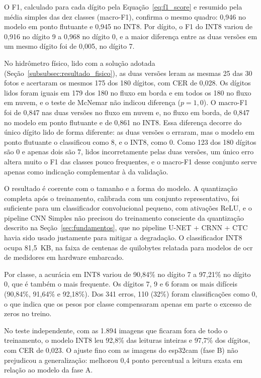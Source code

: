 O F1, calculado para cada dígito pela Equação~\eqref{eq:f1_score} e resumido pela média
simples das dez classes (macro-F1), confirma o mesmo quadro: 0,946 no modelo em ponto
flutuante e 0,945 no INT8. Por dígito, o F1 do INT8 variou de 0,916 no dígito 9 a 0,968 no
dígito 0, e a maior diferença entre as duas versões em um mesmo dígito foi de 0,005, no
dígito 7.

No hidrômetro físico, lido com a solução adotada (Seção~\ref{subsubsec:resultado_fisico}),
as duas versões leram as mesmas 25 das 30 fotos e acertaram os mesmos 175 dos 180 dígitos,
com CER de 0,028. Os dígitos lidos foram iguais em 179 dos 180 no fluxo em borda e em
todos os 180 no fluxo em nuvem, e o teste de McNemar não indicou diferença ($p = 1{,}0$).
O macro-F1 foi de 0,847 nas duas versões no fluxo em nuvem e, no fluxo em borda, de 0,847
no modelo em ponto flutuante e de 0,861 no INT8. Essa diferença decorre do único dígito
lido de forma diferente: as duas versões o erraram, mas o modelo em ponto flutuante o
classificou como 8, e o INT8, como 0. Como 123 dos 180 dígitos são 0 e apenas dois são 7,
lidos incorretamente pelas duas versões, um único erro altera muito o F1 das classes pouco
frequentes, e o macro-F1 desse conjunto serve apenas como indicação complementar à da
validação.

O resultado é coerente com o tamanho e a forma do modelo. A quantização completa após o
treinamento, calibrada com um conjunto representativo, foi suficiente para um classificador
convolucional pequeno, com ativações ReLU, e o pipeline CNN Simples não precisou do treinamento
consciente da quantização descrito na Seção~\ref{sec:fundamentos}, que no pipeline U-NET + CRNN + CTC havia
sido usado justamente para mitigar a degradação. O
classificador INT8 ocupa 81,5~KB, na faixa de
centenas de quilobytes relatada para modelos de \gls{ocr} de medidores em hardware
embarcado.

Por classe, a acurácia em INT8 variou de 90,84\% no dígito 7 a 97,21\% no dígito 0, que é
também o mais frequente. Os dígitos 7, 9 e 6 foram os mais difíceis (90,84\%, 91,64\% e
92,18\%). Dos 341 erros, 110 (32\%) foram classificações como 0, o que indica que os pesos
por classe compensaram apenas em parte o excesso de zeros no treino.

No teste independente, com as 1.894 imagens que ficaram fora de todo o treinamento, o
modelo INT8 leu 92,8\% das leituras inteiras e 97,7\% dos dígitos, com CER de 0,023. O
ajuste fino com as imagens do \gls{esp32cam} (fase B) não prejudicou a generalização:
melhorou 0,4 ponto percentual a leitura exata em relação ao modelo da fase A.


